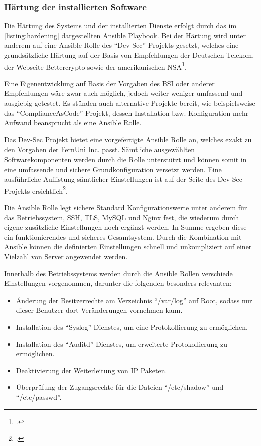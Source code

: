    
\subsubsection{Härtung der installierten Software}

Die Härtung des Systems und der installierten Dienste erfolgt durch das im \autoref{listing:hardening} dargestellten Ansible Playbook. Bei der Härtung wird unter anderem auf eine Ansible Rolle des \enquote{Dev-Sec} Projekts gesetzt, welches eine grundsätzliche Härtung auf der Basis von Empfehlungen der Deutschen Telekom, der Webseite \href{https://bettercrypto.org/}{Bettercrypto} sowie der amerikanischen \ac{NSA}\footcite[Vgl.][]{OverviewDevSecBaselines}. 

Eine Eigenentwicklung auf Basis der Vorgaben des \ac{BSI} oder anderer Empfehlungen wäre zwar auch möglich, jedoch weiter weniger umfassend und ausgiebig getestet. Es stünden auch alternative Projekte bereit, wie beispielsweise das \enquote{ComplianceAsCode} Projekt, dessen Installation bzw. Konfiguration mehr Aufwand beansprucht als eine Ansible Rolle.

Das Dev-Sec Projekt bietet eine vorgefertigte Ansible Rolle an, welches exakt zu den Vorgaben der FernUni Inc. passt. Sämtliche ausgewählten Softwarekomponenten werden durch die Rolle unterstützt und können somit in eine umfassende und sichere Grundkonfiguration versetzt werden. 
Eine ausführliche Auflistung sämtlicher Einstellungen ist auf der Seite des Dev-Sec Projekts ersichtlich\footcite[Vgl.][]{OverviewDevSecBaselines}.

Die Ansible Rolle legt sichere Standard Konfigurationswerte unter anderem für das Betriebssystem, \ac{SSH}, \ac{TLS}, MySQL und Nginx fest, die wiederum durch eigene zusätzliche Einstellungen noch ergänzt werden. In Summe ergeben diese ein funktionierendes und sicheres Gesamtsystem. Durch die Kombination mit Ansible können die definierten Einstellungen schnell und unkompliziert auf einer Vielzahl von Server angewendet werden.

Innerhalb des Betriebssystems werden durch die Ansible Rollen verschiede Einstellungen vorgenommen, darunter die folgenden besonders relevanten:

\begin{itemize}
	\item Änderung der Besitzerrechte am Verzeichnis \enquote{/var/log} auf Root, sodass nur dieser Benutzer dort Veränderungen vornehmen kann.
	\item Installation des \enquote{Syslog} Dienstes, um eine Protokollierung zu ermöglichen.
	\item Installation des \enquote{Auditd} Dienstes, um erweiterte Protokollierung zu ermöglichen.
	\item Deaktivierung der Weiterleitung von \ac{IP} Paketen.
	\item Überprüfung der Zugangsrechte für die Dateien \enquote{/etc/shadow} und \enquote{/etc/passwd}.
\end{itemize}

